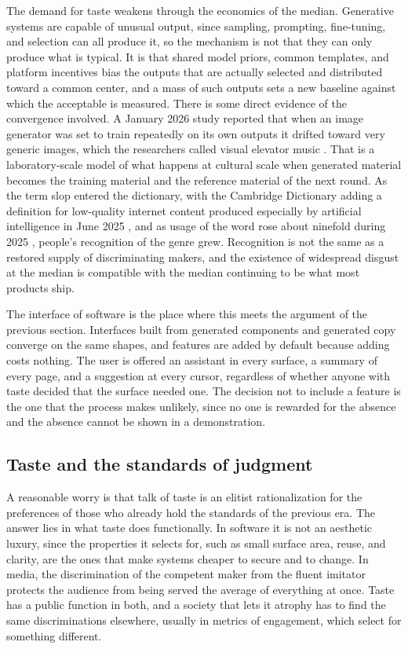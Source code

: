 \documentclass[11pt,a4paper]{article}
\theoremstyle{remark}
\begin{document}
The demand for taste weakens through the economics of the median. Generative systems are capable of unusual output, since sampling, prompting, fine-tuning, and selection can all produce it, so the mechanism is not that they can only produce what is typical. It is that shared model priors, common templates, and platform incentives bias the outputs that are actually selected and distributed toward a common center, and a mass of such outputs sets a new baseline against which the acceptable is measured. There is some direct evidence of the convergence involved. A January 2026 study reported that when an image generator was set to train repeatedly on its own outputs it drifted toward very generic images, which the researchers called visual elevator music \cite{PourOver2026}. That is a laboratory-scale model of what happens at cultural scale when generated material becomes the training material and the reference material of the next round. As the term slop entered the dictionary, with the Cambridge Dictionary adding a definition for low-quality internet content produced especially by artificial intelligence in June 2025 \cite{Slop2026Folk}, and as usage of the word rose about ninefold during 2025 \cite{Meltwater2026}, people's recognition of the genre grew. Recognition is not the same as a restored supply of discriminating makers, and the existence of widespread disgust at the median is compatible with the median continuing to be what most products ship.

The interface of software is the place where this meets the argument of the previous section. Interfaces built from generated components and generated copy converge on the same shapes, and features are added by default because adding costs nothing. The user is offered an assistant in every surface, a summary of every page, and a suggestion at every cursor, regardless of whether anyone with taste decided that the surface needed one. The decision not to include a feature is the one that the process makes unlikely, since no one is rewarded for the absence and the absence cannot be shown in a demonstration.

\subsection{Taste and the standards of judgment}

A reasonable worry is that talk of taste is an elitist rationalization for the preferences of those who already hold the standards of the previous era. The answer lies in what taste does functionally. In software it is not an aesthetic luxury, since the properties it selects for, such as small surface area, reuse, and clarity, are the ones that make systems cheaper to secure and to change. In media, the discrimination of the competent maker from the fluent imitator protects the audience from being served the average of everything at once. Taste has a public function in both, and a society that lets it atrophy has to find the same discriminations elsewhere, usually in metrics of engagement, which select for something different.
\end{document}
